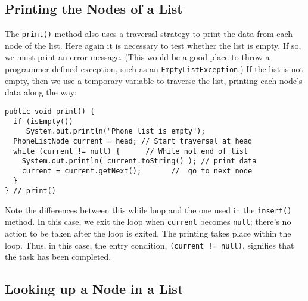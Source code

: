 \subsection*{Printing the Nodes of a List}

\noindent The {\tt print()} method also uses a traversal strategy to print the
data from each node of the list.  Here again it is necessary to test
whether the list is empty.  If so, we must print an error message.
(This would be a good place to throw a programmer-defined exception,
such as an {\tt EmptyList\-Exception}.)  If the list is not empty, then
we use a temporary variable to traverse the list, printing
each node's data along the way:

\begin{jjjlisting}
\begin{lstlisting}
public void print() {
  if (isEmpty())
     System.out.println("Phone list is empty");
  PhoneListNode current = head; // Start traversal at head
  while (current != null) {      // While not end of list
    System.out.println( current.toString() ); // print data
    current = current.getNext();       //  go to next node
  }
} // print()
\end{lstlisting}
\end{jjjlisting}

\noindent Note the differences between this while loop and
the one used in the {\tt insert()} method.  In this case, we exit the
loop when {\tt current} becomes {\tt null}; there's no action to be
taken after the loop is exited.  The printing takes place within the
loop.  Thus, in this case, the entry condition, {\tt (current != null)},
signifies that the task has been completed.


\subsection*{Looking up a Node in a List}

